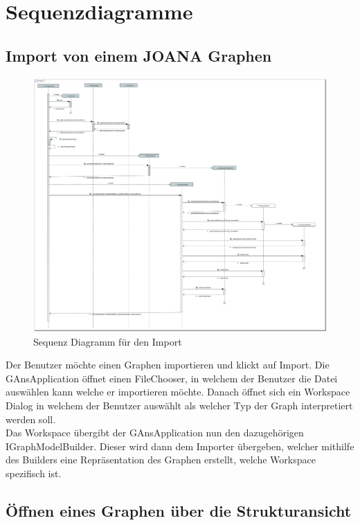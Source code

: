 \chapter{Sequenzdiagramme}

\section{Import von einem JOANA Graphen}

\begin{figure}[!htbp]
  \centering
  \includegraphics[width=450pt]{resourcen/SeqDiagramImport.PDF}
  \caption{Sequenz Diagramm für den Import}
  \label{fig:seq:import}
\end{figure}

Der Benutzer möchte einen Graphen importieren und klickt auf Import. Die GAnsApplication öffnet einen FileChooser, in welchem der Benutzer die Datei auswählen kann welche er importieren möchte. Danach öffnet sich ein Workspace Dialog in welchem der Benutzer auswählt als welcher Typ der Graph interpretiert werden soll.\\
Das Workspace übergibt der GAnsApplication nun den dazugehörigen IGraphModelBuilder. Dieser wird dann dem Importer übergeben, welcher mithilfe des Builders eine Repräsentation des Graphen erstellt, welche Workspace spezifisch ist.

\newpage

\section{Öffnen eines Graphen über die Strukturansicht}

